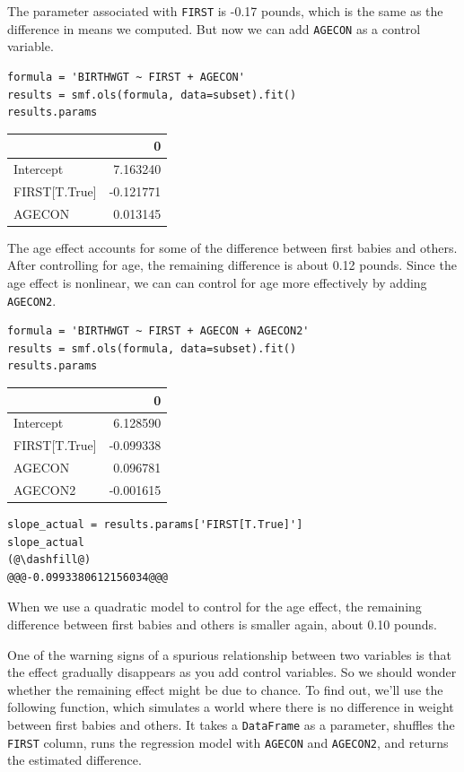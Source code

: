 The parameter associated with \passthrough{\lstinline!FIRST!} is -0.17
pounds, which is the same as the difference in means we computed. But
now we can add \passthrough{\lstinline!AGECON!} as a control variable.

\begin{lstlisting}[]
formula = 'BIRTHWGT ~ FIRST + AGECON'
results = smf.ols(formula, data=subset).fit()
results.params
\end{lstlisting}

\begin{tabular}{lr}
\midrule
{} &         0 \\
\midrule
Intercept     &  7.163240 \\
FIRST[T.True] & -0.121771 \\
AGECON        &  0.013145 \\
\midrule
\end{tabular}

The age effect accounts for some of the difference between first babies
and others. After controlling for age, the remaining difference is about
0.12 pounds. Since the age effect is nonlinear, we can can control for
age more effectively by adding \passthrough{\lstinline!AGECON2!}.

\begin{lstlisting}[]
formula = 'BIRTHWGT ~ FIRST + AGECON + AGECON2'
results = smf.ols(formula, data=subset).fit()
results.params
\end{lstlisting}

\begin{tabular}{lr}
\midrule
{} &         0 \\
\midrule
Intercept     &  6.128590 \\
FIRST[T.True] & -0.099338 \\
AGECON        &  0.096781 \\
AGECON2       & -0.001615 \\
\midrule
\end{tabular}

\begin{lstlisting}[]
slope_actual = results.params['FIRST[T.True]']
slope_actual
(@\dashfill@)
@@@-0.0993380612156034@@@
\end{lstlisting}

When we use a quadratic model to control for the age effect, the
remaining difference between first babies and others is smaller again,
about 0.10 pounds.

One of the warning signs of a spurious relationship between two
variables is that the effect gradually disappears as you add control
variables. So we should wonder whether the remaining effect might be due
to chance. To find out, we'll use the following function, which
simulates a world where there is no difference in weight between first
babies and others. It takes a \passthrough{\lstinline!DataFrame!} as a
parameter, shuffles the \passthrough{\lstinline!FIRST!} column, runs the
regression model with \passthrough{\lstinline!AGECON!} and
\passthrough{\lstinline!AGECON2!}, and returns the estimated difference.

